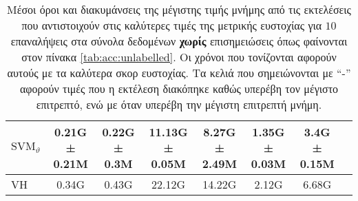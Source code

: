 \begin{table}[]
\begin{adjustbox}{angle=90}
{{\begin{tabular}{|l|c|c|c|c|c|c|c|}
$\text{SVM}_{\vartheta}$ &   0.21G ± 0.21M &    0.22G ± 0.3M &   11.13G ± 0.05M &    8.27G ± 2.49M &   1.35G ± 0.03M &    3.4G ± 0.15M \\\hline
VH              &           0.34G &           0.43G &           22.12G &           14.22G &           2.12G &           6.68G \\\hline
\end{tabular}
}
}
\end{adjustbox}
\caption[Μέσοι όροι και διακυμάνσεις της μέγιστης τιμής μνήμης από τις εκτελέσεις που αντιστοιχούν στις καλύτερες τιμές της μετρικής ευστοχίας για $10$ επαναλήψεις  στα σύνολα δεδομένων χωρίς επισημειώσεις.]{\small Μέσοι όροι και διακυμάνσεις της μέγιστης τιμής μνήμης από τις εκτελέσεις που αντιστοιχούν στις καλύτερες τιμές της μετρικής ευστοχίας για $10$ επαναλήψεις  στα σύνολα δεδομένων \textbf{χωρίς} επισημειώσεις όπως φαίνονται στον πίνακα \ref{tab:acc:unlabelled}. Οι χρόνοι που τονίζονται αφορούν αυτούς με τα καλύτερα σκορ ευστοχίας. Τα κελιά που σημειώνονται με ``-'' αφορούν τιμές που η εκτέλεση διακόπηκε καθώς υπερέβη τον μέγιστο επιτρεπτό, ενώ με  όταν υπερέβη την μέγιστη επιτρεπτή μνήμη.}
\label{tab:mem:unlabelled}
\end{table}

\newpage
